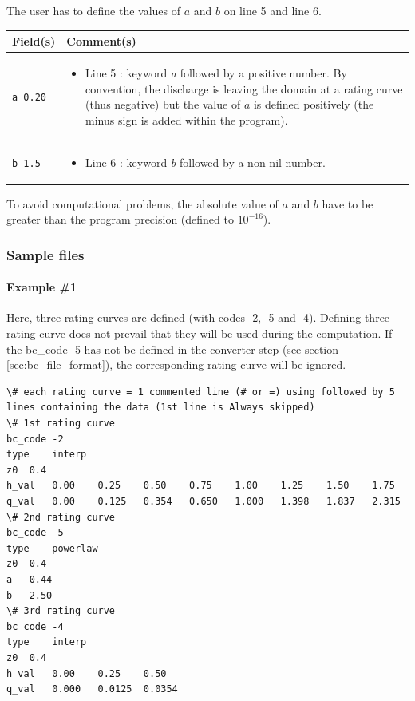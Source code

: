 \begin{description}
The user has to define the values of $a$ and $b$ on line 5 and line 6.


 \begin{tabular}{p{5cm} | p{8.5cm}}

    \hline
    Field(s) & Comment(s) \\
    \hline  \hline
    \texttt{a	0.20} & \begin{itemize}\item Line 5 : keyword \emph{a} followed by a positive number. By convention, the discharge is leaving the domain at a rating curve (thus negative) but the value of $a$ is defined positively (the minus sign is added within the program).\end{itemize} \\
		\texttt{b	1.5} & \begin{itemize}\item Line 6 : keyword \emph{b} followed by a non-nil number.  \end{itemize} \\
\end{tabular}
To avoid computational problems, the absolute value of $a$ and $b$ have to be greater than the program precision (defined to $10^{-16}$).
\end{description}   


		
%    
\subsubsection{Sample files}
\paragraph*{Example \#1}
Here, three rating curves are defined (with codes -2, -5 and -4). Defining three rating curve does not prevail that they will be used during the computation. If the bc\_code -5 has not be defined in the converter step (see section \ref{sec:bc_file_format}), the corresponding rating curve will be ignored.
\begin{verbatim}
\# each rating curve = 1 commented line (# or =) using followed by 5 lines containing the data (1st line is Always skipped)
\# 1st rating curve
bc_code	-2
type	interp
z0	0.4
h_val	0.00	0.25	0.50	0.75	1.00	1.25	1.50	1.75
q_val	0.00	0.125	0.354	0.650	1.000	1.398	1.837	2.315
\# 2nd rating curve
bc_code	-5
type	powerlaw
z0	0.4
a	0.44
b	2.50
\# 3rd rating curve
bc_code	-4
type	interp
z0	0.4
h_val	0.00	0.25	0.50
q_val	0.000	0.0125	0.0354
\end{verbatim}
